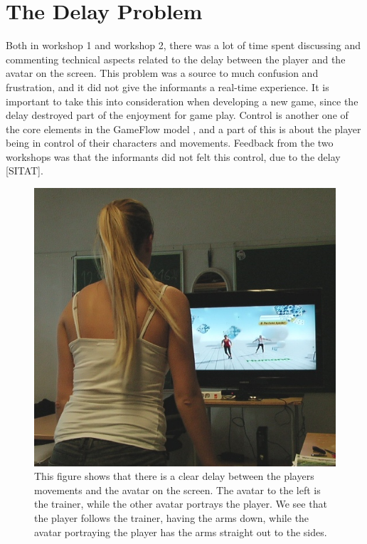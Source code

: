 \section{The Delay Problem}
\label{sec:delay}
Both in workshop 1 and workshop 2, there was a lot of time spent discussing and commenting technical aspects related to the delay between the player and the avatar on the screen. This problem was a source to much confusion and frustration, and it did not give the informants a real-time experience. It is important to take this into consideration when developing a new game, since the delay destroyed part of the enjoyment for game play. Control is another one of the core elements in the GameFlow model \cite{sweetser}, and a part of this is about the player being in control of their characters and movements. Feedback from the two workshops was that the informants did not felt this control, due to the delay [SITAT].  

\begin{figure} [H]
\centering
\includegraphics[scale=0.6]{kineDelay.jpg}
\caption[The Kinect sensor delay]{This figure shows that there is a clear delay between the players movements and the avatar on the screen. The avatar to the left is the trainer, while the other avatar portrays the player. We see that the player follows the trainer, having the arms down, while the avatar portraying the player has the arms straight out to the sides.}
\label{pickingapples}
\end{figure}

